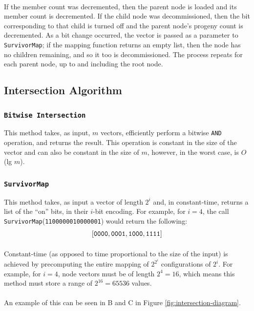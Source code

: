 \documentclass[11pt,letterpaper]{article}
\begin{document}
\paragraph{}
If the member count was decremented, then the parent node is loaded
and its member count is decremented.  If the child node was decommissioned,
then the bit corresponding to that child is turned off and the parent node's
progeny count is decremented.  As a bit change occurred, the vector is passed
as a parameter to {\tt SurvivorMap}; if the mapping function returns an
empty list, then the node has no children remaining, and so it too
is decommissioned.  The process repeats for each parent node, up to and
including the root node.

\subsection{Intersection Algorithm}
\subsubsection{{\tt Bitwise Intersection}}
This method takes, as input, $m$ vectors, efficiently perform
a bitwise {\tt AND} operation, and returns the result.
This operation is constant in the size of the vector and can also be
constant in the size of $m$, however, in the worst case, is $O$(lg $m$).

\subsubsection{{\tt SurvivorMap}}
This method takes, as input a vector of length $2^i$ and, in constant-time,
returns a list of the ``on'' bits, in their $i$-bit encoding.  For example,
for $i=4$, the call {\tt SurvivorMap}({\tt 1100000010000001}) would
return the following:
\[ {\tt [0000,0001,1000,1111]}\]

\paragraph{}
Constant-time (as opposed to time proportional to the size of the input)
is achieved by precomputing the entire mapping of $2^{2^i}$ configurations
of $2^i$.  For example, for $i=4$, node vectors must be of length $2^4=16$,
which means this method must store a range of $2^16=65536$ values.

\paragraph{}
An example of this can be seen in B and C in Figure \ref{fig:intersection-diagram}.
\end{document}

